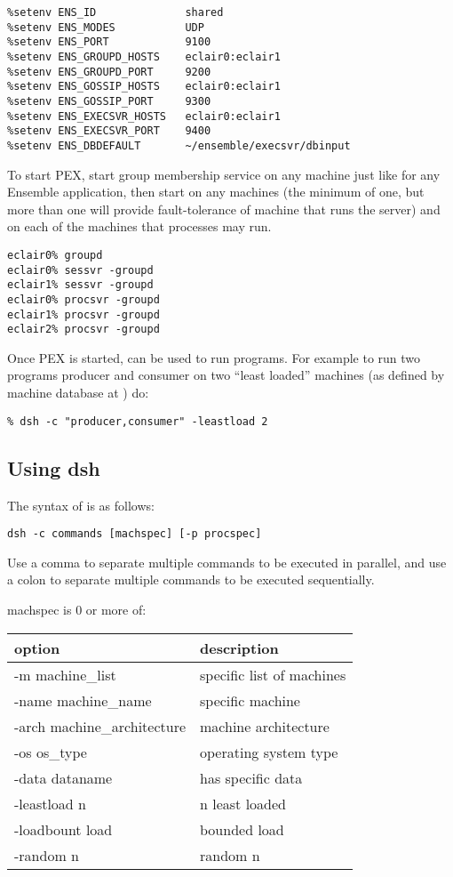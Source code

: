 \begin{verbatim}
%setenv ENS_ID              shared
%setenv ENS_MODES           UDP
%setenv ENS_PORT            9100
%setenv ENS_GROUPD_HOSTS    eclair0:eclair1
%setenv ENS_GROUPD_PORT     9200
%setenv ENS_GOSSIP_HOSTS    eclair0:eclair1
%setenv ENS_GOSSIP_PORT     9300
%setenv ENS_EXECSVR_HOSTS   eclair0:eclair1
%setenv ENS_EXECSVR_PORT    9400
%setenv ENS_DBDEFAULT       ~/ensemble/execsvr/dbinput
\end{verbatim}
 
To start PEX, start group membership service
 on any machine just like for any Ensemble application,
then start  on any machines (the minimum of one, but
more than one will provide fault-tolerance of machine that runs
the server) and  on each of the machines that
processes may run.

\begin{verbatim}
eclair0% groupd
eclair0% sessvr -groupd
eclair1% sessvr -groupd
eclair0% procsvr -groupd
eclair1% procsvr -groupd
eclair2% procsvr -groupd
\end{verbatim}

Once PEX is started,  can be used to run
programs.  For example to run two programs producer and consumer on
two ``least loaded'' machines (as defined by machine database at
) do:
\begin{verbatim}
% dsh -c "producer,consumer" -leastload 2
\end{verbatim}


\subsection{Using dsh}
The syntax of  is as follows:
\begin{verbatim}
dsh -c commands [machspec] [-p procspec]
\end{verbatim}

Use a comma to separate multiple commands to be executed in
parallel, and use a colon to separate multiple commands to
be executed sequentially.

machspec is 0 or more of:
\begin{center}
\begin{tabular}{|l|l|}					   \hline
option			& description			\\ \hline
-m machine\_list	& specific list of machines	\\
-name machine\_name		& specific machine	\\
-arch machine\_architecture	& machine architecture	\\
-os os\_type			& operating system type	\\
-data dataname			& has specific data	\\
-leastload n			& n least loaded	\\
-loadbount load			& bounded load	\\
-random n			& random n	\\ \hline
\end{tabular}
\end{center}


